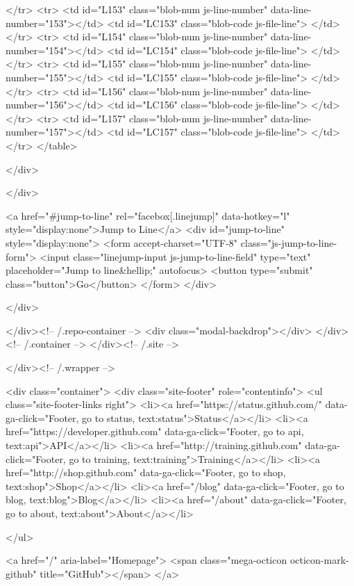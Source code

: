       </tr>
      <tr>
        <td id="L153" class="blob-num js-line-number" data-line-number="153"></td>
        <td id="LC153" class="blob-code js-file-line">
</td>
      </tr>
      <tr>
        <td id="L154" class="blob-num js-line-number" data-line-number="154"></td>
        <td id="LC154" class="blob-code js-file-line">
</td>
      </tr>
      <tr>
        <td id="L155" class="blob-num js-line-number" data-line-number="155"></td>
        <td id="LC155" class="blob-code js-file-line">
</td>
      </tr>
      <tr>
        <td id="L156" class="blob-num js-line-number" data-line-number="156"></td>
        <td id="LC156" class="blob-code js-file-line">
</td>
      </tr>
      <tr>
        <td id="L157" class="blob-num js-line-number" data-line-number="157"></td>
        <td id="LC157" class="blob-code js-file-line">
</td>
      </tr>
</table>

  </div>

</div>

<a href="#jump-to-line" rel="facebox[.linejump]" data-hotkey="l" style="display:none">Jump to Line</a>
<div id="jump-to-line" style="display:none">
  <form accept-charset="UTF-8" class="js-jump-to-line-form">
    <input class="linejump-input js-jump-to-line-field" type="text" placeholder="Jump to line&hellip;" autofocus>
    <button type="submit" class="button">Go</button>
  </form>
</div>

        </div>

      </div><!-- /.repo-container -->
      <div class="modal-backdrop"></div>
    </div><!-- /.container -->
  </div><!-- /.site -->


    </div><!-- /.wrapper -->

      <div class="container">
  <div class="site-footer" role="contentinfo">
    <ul class="site-footer-links right">
        <li><a href="https://status.github.com/" data-ga-click="Footer, go to status, text:status">Status</a></li>
      <li><a href="https://developer.github.com" data-ga-click="Footer, go to api, text:api">API</a></li>
      <li><a href="http://training.github.com" data-ga-click="Footer, go to training, text:training">Training</a></li>
      <li><a href="http://shop.github.com" data-ga-click="Footer, go to shop, text:shop">Shop</a></li>
        <li><a href="/blog" data-ga-click="Footer, go to blog, text:blog">Blog</a></li>
        <li><a href="/about" data-ga-click="Footer, go to about, text:about">About</a></li>

    </ul>

    <a href="/" aria-label="Homepage">
      <span class="mega-octicon octicon-mark-github" title="GitHub"></span>
    </a>

